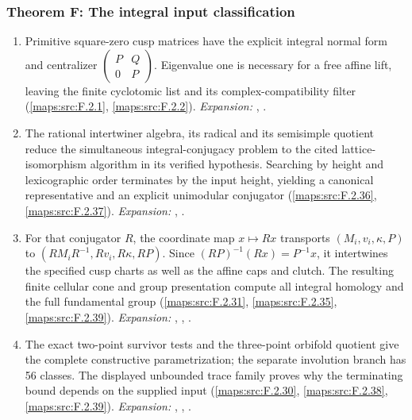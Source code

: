 \subsubsection*{Theorem F: The integral input classification}
\begin{enumerate}[label=\arabic*.,leftmargin=*]
\item\hypertarget{step-V-F-1}{} Primitive square-zero cusp matrices have the explicit integral
  normal form and centralizer
  $\left(\begin{smallmatrix}P&Q\\0&P\end{smallmatrix}\right)$.
  Eigenvalue one is necessary for a free affine lift, leaving the
  finite cyclotomic list and its complex-compatibility filter
  (\cref{maps:src:F.2.1}, \cref{maps:src:F.2.2}).
\textit{Expansion:} , .
\item\hypertarget{step-V-F-2}{} The rational intertwiner algebra, its radical and its
  semisimple quotient reduce the simultaneous integral-conjugacy
  problem to the cited lattice-isomorphism algorithm in its verified
  hypothesis.  Searching by height and lexicographic order terminates
  by the input height, yielding a canonical representative and an
  explicit unimodular conjugator (\cref{maps:src:F.2.36}, \cref{maps:src:F.2.37}).
\textit{Expansion:} , .
\item\hypertarget{step-V-F-3}{} For that conjugator $R$, the coordinate map $x\mapsto Rx$
  transports $(M_i,v_i,\kappa,P)$ to
  $(RM_iR^{-1},Rv_i,R\kappa,RP)$.  Since
  $(RP)^{-1}(Rx)=P^{-1}x$, it intertwines the specified cusp charts
  as well as the affine caps and clutch.  The resulting finite
  cellular cone and group presentation compute all integral homology
  and the full fundamental group (\cref{maps:src:F.2.31}, \cref{maps:src:F.2.35}, \cref{maps:src:F.2.39}).
\textit{Expansion:} , , .
\item\hypertarget{step-V-F-4}{} The exact two-point survivor tests and the three-point
  orbifold quotient give the complete constructive parametrization;
  the separate involution branch has 56 classes.  The displayed
  unbounded trace family proves why the terminating bound depends on
  the supplied input (\cref{maps:src:F.2.30}, \cref{maps:src:F.2.38}, \cref{maps:src:F.2.39}).
\textit{Expansion:} , , .

\end{enumerate}

